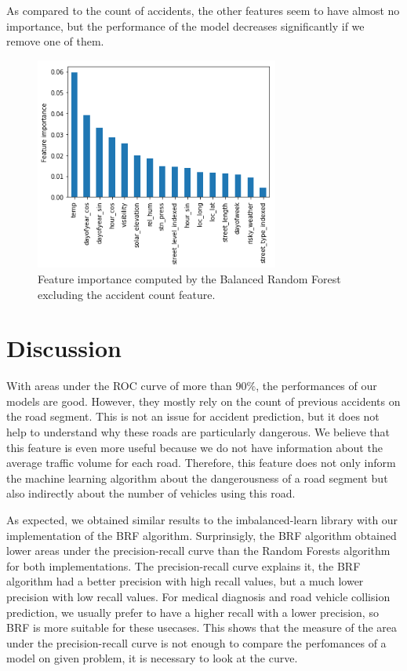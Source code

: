 \documentclass[conference]{IEEEtran}
\begin{document}
As compared to the count of accidents, the other features seem to have almost no
importance, but the performance of the model decreases significantly if we
remove one of them. 

\begin{figure}[htbp]
\centerline{\includegraphics[height=7cm, keepaspectratio]{figures/brf_fi_nocount.png}}
\caption{Feature importance computed by the Balanced Random Forest excluding the accident count feature.}
\label{feature importances}
\end{figure}

\section{Discussion}

With areas under the ROC curve of more than $90\%$, the performances of our models are good.
However, they mostly rely on the count of previous accidents on the road segment. 
This is not an issue for accident prediction, but it does not help to 
understand why these roads are particularly dangerous. We believe that
this feature is even more useful because we do not have information
about the average traffic volume for each road. Therefore, this feature does
not only inform the machine learning algorithm about the dangerousness of a road
segment but also indirectly about the number of vehicles using this road.

As expected, we obtained similar results to the imbalanced-learn library with our implementation of the BRF algorithm. Surprinsigly, the BRF algorithm obtained lower areas under the precision-recall curve than the Random Forests algorithm for both implementations. The precision-recall curve explains it, the BRF algorithm had a better precision with high recall values, but a much lower precision with low recall values. For medical diagnosis and road vehicle collision prediction, we usually prefer to have a higher recall with a lower precision, so BRF is more suitable for these usecases. This shows that the measure of the area under the precision-recall curve is not enough to compare the perfomances of a model on given problem, it is necessary to look at the curve. 
\end{document}
